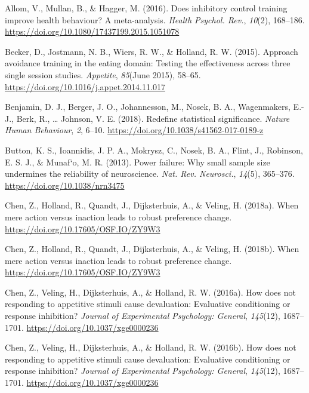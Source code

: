 \documentclass[man,floatsintext]{apa6}
\begin{document}
\leavevmode\hypertarget{ref-allom_does_2016}{}%
Allom, V., Mullan, B., \& Hagger, M. (2016). Does inhibitory control training improve health behaviour? A meta-analysis. \emph{Health Psychol. Rev.}, \emph{10}(2), 168--186. \url{https://doi.org/10.1080/17437199.2015.1051078}

\leavevmode\hypertarget{ref-becker_approach_2015-1}{}%
Becker, D., Jostmann, N. B., Wiers, R. W., \& Holland, R. W. (2015). Approach avoidance training in the eating domain: Testing the effectiveness across three single session studies. \emph{Appetite}, \emph{85}(June 2015), 58--65. \url{https://doi.org/10.1016/j.appet.2014.11.017}

\leavevmode\hypertarget{ref-benjamin_redefine_2017}{}%
Benjamin, D. J., Berger, J. O., Johannesson, M., Nosek, B. A., Wagenmakers, E.-J., Berk, R., \ldots{} Johnson, V. E. (2018). Redefine statistical significance. \emph{Nature Human Behaviour}, \emph{2}, 6--10. \url{https://doi.org/10.1038/s41562-017-0189-z}

\leavevmode\hypertarget{ref-button_power_2013}{}%
Button, K. S., Ioannidis, J. P. A., Mokrysz, C., Nosek, B. A., Flint, J., Robinson, E. S. J., \& Munaf\a`o, M. R. (2013). Power failure: Why small sample size undermines the reliability of neuroscience. \emph{Nat. Rev. Neurosci.}, \emph{14}(5), 365--376. \url{https://doi.org/10.1038/nrn3475}

\leavevmode\hypertarget{ref-chen_when_2018}{}%
Chen, Z., Holland, R., Quandt, J., Dijksterhuis, A., \& Veling, H. (2018a). When mere action versus inaction leads to robust preference change. \url{https://doi.org/10.17605/OSF.IO/ZY9W3}

\leavevmode\hypertarget{ref-chenWhenMereAction2018}{}%
Chen, Z., Holland, R., Quandt, J., Dijksterhuis, A., \& Veling, H. (2018b). When mere action versus inaction leads to robust preference change. \url{https://doi.org/10.17605/OSF.IO/ZY9W3}

\leavevmode\hypertarget{ref-chen_how_2016-1}{}%
Chen, Z., Veling, H., Dijksterhuis, A., \& Holland, R. W. (2016a). How does not responding to appetitive stimuli cause devaluation: Evaluative conditioning or response inhibition? \emph{Journal of Experimental Psychology: General}, \emph{145}(12), 1687--1701. \url{https://doi.org/10.1037/xge0000236}

\leavevmode\hypertarget{ref-chen_how_2016}{}%
Chen, Z., Veling, H., Dijksterhuis, A., \& Holland, R. W. (2016b). How does not responding to appetitive stimuli cause devaluation: Evaluative conditioning or response inhibition? \emph{Journal of Experimental Psychology: General}, \emph{145}(12), 1687--1701. \url{https://doi.org/10.1037/xge0000236}
\end{document}
